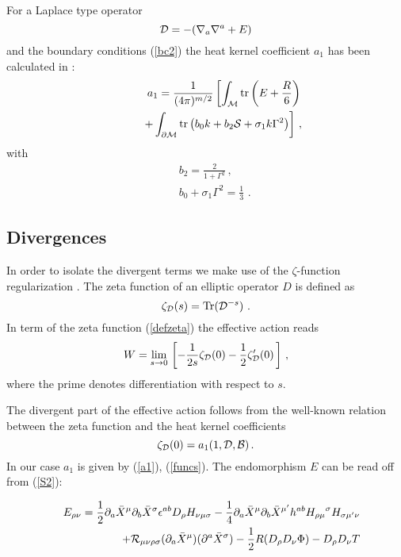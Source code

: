 \documentclass[a4paper,12pt]{article}
\newcommand{\plabel}{\label}
\begin{document}
For a Laplace type operator
\begin{equation}
{\cal D}=-(\nabla_a\nabla^a +E) \label{defD}
\end{equation}
and the boundary conditions (\ref{bc2}) the heat kernel
coefficient $a_1$ has been calculated in  \cite{McO}:
\begin{eqnarray}
&&a_1 =\frac 1{(4\pi )^{m/2}} \left[
\int_{\cal M}{\rm tr} \left( E +\frac R6 \right) \right. 
\nonumber \\
&&\qquad \left.
+\int_{\partial {\cal M}} {\rm tr} \left( b_0 k +b_2 {\cal S} +\sigma_1 k
\Gamma^2 \right) \right] \,,
\label{a1}
\end{eqnarray}
with
\begin{eqnarray}
 && b_{2}=\frac{2}{1+\Gamma ^{2}}\,,\nonumber \\
 && b_{0}+\sigma _{1}\Gamma ^{2}=\frac{1}{3}\, \,. \label {funcs}
\end{eqnarray}

\subsection{Divergences}

In order to isolate the divergent terms 
 we make use of the \( \zeta  \)-function regularization \cite{zeta}.
The zeta function of an elliptic operator \( D \) is defined as 
\begin{equation}
\zeta _{\cal D}(s)={\textrm{Tr}}({\cal D}^{-s})\, \, .\plabel {defzeta}
\end{equation}
 In term of the zeta function (\ref{defzeta}) the effective action 
reads 
\begin{equation}
W= \lim\limits_{s \to 0}\, \left[ -\frac{1}{2s}\zeta 
_{\cal D}(0)-\frac{1}{2}\zeta'_{\cal D}(0)\, \right]\,,\label {W2}
\end{equation}
 where the prime denotes differentiation with respect to \( s \).

The divergent part of the effective action follows from 
the well-known relation between the zeta function and the heat kernel
coefficients 
\begin{equation}
 \zeta _{\cal D}(0)=a_{1}(1,{\cal D},{\mathcal{B}}) \,. \label{zetaa1}
\end{equation}
In our case $a_1$ is given by (\ref{a1}), (\ref{funcs}).
The endomorphism $E$ can be read off from (\ref{S2}):

\begin{eqnarray}
&&E_{\rho\nu}=\frac 12 \partial_a\bar X^\mu 
\partial_b\bar X^\sigma \epsilon^{ab} D_\rho H_{\nu\mu\sigma}
-\frac 14 \partial_a\bar X^\mu\partial_b\bar X^{\mu'}h^{ab}
{H_{\rho\mu}}^\sigma H_{\sigma\mu'\nu} \nonumber \\
&&\quad +{\cal R}_{\mu\nu\rho\sigma}(\partial_a\bar X^\mu )
(\partial^a\bar X^\sigma ) -\frac 12 R(D_\rho D_\nu \Phi )
-D_\rho D_\nu T \label{Egen}
\end{eqnarray}
\end{document}
